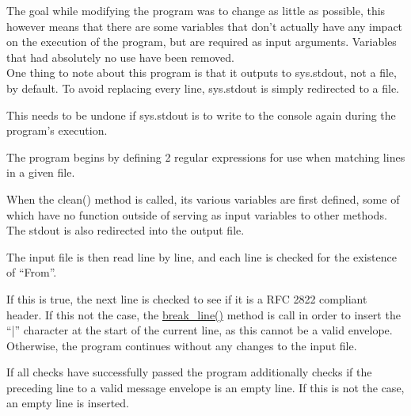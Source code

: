 \documentclass[a4paper,english]{report}
\begin{document}
The goal while modifying the program was to change as little as possible, this however means that there are some variables that don't actually have any impact on the execution of the program, but are required as input arguments. Variables that had absolutely no use have been removed.\\

One thing to note about this program is that it outputs to sys.stdout, not a file, by default. To avoid replacing every line,  sys.stdout is simply redirected to a file.




This needs to be undone if sys.stdout is to write to the console again during the program's execution.\\

\noindent

The program begins by defining 2 regular expressions for use when matching lines in a given file. 





When the clean() method is called, its various variables are first defined, some of which have no function outside of serving as input variables to other methods. The stdout is also redirected into the output file.



The input file is then read line by line, and each line is checked for the existence of “From”.






 If this is true, the next line is checked to see if it is a RFC 2822 \cite{RFC2822} compliant header. If this not the case, the \url{break_line()} method is call in order to insert the “|” character at the start of the current line, as this cannot be a valid envelope. Otherwise, the program continues without any changes to the input file.





If all checks have successfully passed the program additionally checks if the preceding line to a valid message envelope is an empty line. If this is not the case, an empty line is inserted.
\end{document}
